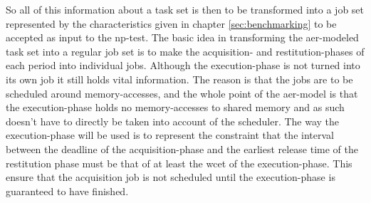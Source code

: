 \documentclass{kththesis}
\begin{document}
So all of this information about a task set is then to be transformed into a job set represented by
the characteristics given in chapter \ref{sec:benchmarking} to be accepted as input to the
\acrshort{np}-test. The basic idea in transforming the \acrshort{aer}-modeled task set into a
regular job set is to make the acquisition- and restitution-phases of each period into individual
jobs. Although the execution-phase is not turned into its own job it still holds vital information.
The reason is that the jobs are to be scheduled around memory-accesses, and the whole point of the
\acrshort{aer}-model is that the execution-phase holds no memory-accesses to shared memory and as
such doesn't have to directly be taken into account of the scheduler. The way the execution-phase
will be used is to represent the constraint that the interval between the deadline of the
acquisition-phase and the earliest release time of the restitution phase must be that of at least
the \acrshort{wcet} of the execution-phase. This ensure that the acquisition job is not scheduled
until the execution-phase is guaranteed to have finished. 
\end{document}
